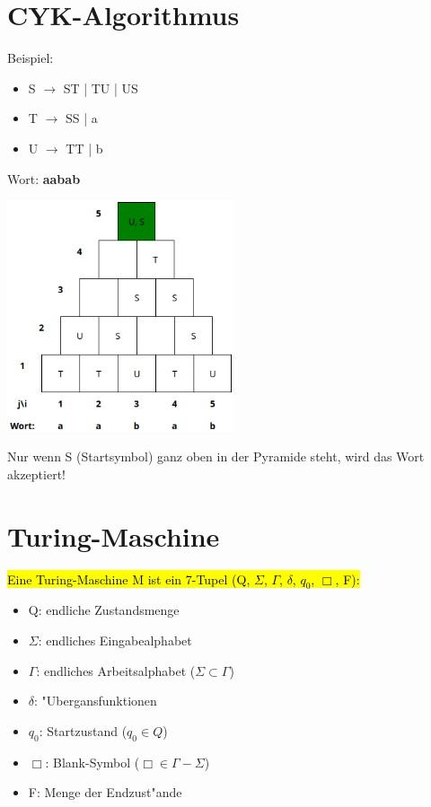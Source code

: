 \documentclass[11pt, a4paper]{scrartcl}
\begin{document}
\newpage


\section{CYK-Algorithmus}

Beispiel:

\begin{itemize}
    \item S $\rightarrow$ ST | TU | US
    \item T $\rightarrow$ SS | a
    \item U $\rightarrow$ TT | b
\end{itemize}

Wort: \textbf{aabab}

\vspace{2em}

\includegraphics[width=0.5\textwidth]{CYK-00.png}

\vspace{2em}

Nur wenn S (Startsymbol) ganz oben in der Pyramide steht, wird das Wort akzeptiert!

\newpage


\section{Turing-Maschine}

\hl{Eine Turing-Maschine M ist ein 7-Tupel (Q, $\Sigma$, $\Gamma$, $\delta$, $q_0$, $\Box$, F):}

\begin{itemize}
    \item Q: endliche Zustandsmenge
    \item $\Sigma$: endliches Eingabealphabet
    \item $\Gamma$: endliches Arbeitsalphabet ($\Sigma \subset \Gamma$)
    \item $\delta$: "Ubergansfunktionen
    \item $q_0$: Startzustand ($q_0 \in Q$)
    \item $\Box$: Blank-Symbol ($\Box \in \Gamma - \Sigma$)
    \item F: Menge der Endzust"ande
\end{itemize}
\end{document}
